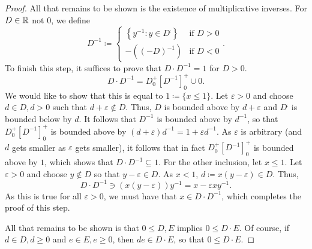 \begin{thm}
\begin{proof}
All that remains to be shown is the existence of multiplicative inverses.  For $D\in \mathbb{R}$ not $0$, we define
\begin{equation}
D^{-1}\coloneqq \begin{cases}\left\{ y^{-1}:y\in D^{\comp}\right\} & \text{if }D>0 \\ -\left( (-D)^{-1}\right) & \text{if }D<0\end{cases}.
\end{equation}
To finish this step, it suffices to prove that $D\cdot D^{-1}=1$ for $D>0$.
\begin{equation}
D\cdot D^{-1}=D_0^+[D^{-1}]_0^+\cup 0.
\end{equation}
We would like to show that this is equal to $1\coloneqq \{ x\leq 1\}$.  Let $\varepsilon >0$ and choose $d\in D,d>0$ such that $d+\varepsilon \notin D$.  Thus, $D$ is bounded above by $d+\varepsilon$ and $D^{\comp}$ is bounded below by $d$.  It follows that $D^{-1}$ is bounded above by $d^{-1}$, so that $D_0^+[D^{-1}]_0^+$ is bounded above by $(d+\varepsilon )d^{-1}=1+\varepsilon d^{-1}$.  As $\varepsilon$ is arbitrary (and $d$ gets smaller as $\varepsilon$ gets smaller), it follows that in fact $D_0^+[D^{-1}]_0^+$ is bounded above by $1$, which shows that $D\cdot D^{-1}\subseteq 1$.  For the other inclusion, let $x\leq 1$.  Let $\varepsilon >0$ and choose $y\notin D$ so that $y-\varepsilon \in D$.  As $x<1$, $d\coloneqq x(y-\varepsilon )\in D$.  Thus,
\begin{equation}
D\cdot D^{-1}\ni \left( x(y-\varepsilon )\right) y^{-1}=x-\varepsilon xy^{-1}.
\end{equation}
As this is true for all $\varepsilon >0$, we must have that $x\in D\cdot D^{-1}$, which completes the proof of this step.

All that remains to be shown is that $0\leq D,E$ implies $0\leq D\cdot E$.  Of course, if $d\in D,d\geq 0$ and $e\in E,e\geq 0$, then $de\in D\cdot E$, so that $0\leq D\cdot E$.


\end{proof}
\end{thm}
